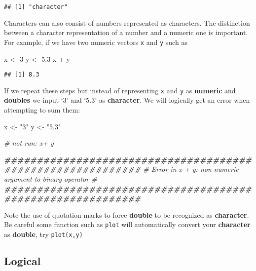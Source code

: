 \documentclass[
]{article}
\newenvironment{Shaded}{\begin{snugshade}}{\end{snugshade}}
\newcommand{\CommentTok}[1]{\textcolor[rgb]{0.56,0.35,0.01}{\textit{#1}}}
\newcommand{\DecValTok}[1]{\textcolor[rgb]{0.00,0.00,0.81}{#1}}
\newcommand{\DocumentationTok}[1]{\textcolor[rgb]{0.56,0.35,0.01}{\textbf{\textit{#1}}}}
\newcommand{\FloatTok}[1]{\textcolor[rgb]{0.00,0.00,0.81}{#1}}
\newcommand{\NormalTok}[1]{#1}
\newcommand{\OtherTok}[1]{\textcolor[rgb]{0.56,0.35,0.01}{#1}}
\newcommand{\SpecialCharTok}[1]{\textcolor[rgb]{0.00,0.00,0.00}{#1}}
\newcommand{\StringTok}[1]{\textcolor[rgb]{0.31,0.60,0.02}{#1}}
\begin{document}
\begin{verbatim}
## [1] "character"
\end{verbatim}

Characters can also consist of numbers represented as characters. The
distinction between a character representation of a number and a numeric
one is important. For example, if we have two numeric vectors \texttt{x}
and \texttt{y} such as

\begin{Shaded}
\begin{Highlighting}[]
\NormalTok{x }\OtherTok{\textless{}{-}} \DecValTok{3}
\NormalTok{y }\OtherTok{\textless{}{-}} \FloatTok{5.3}
\NormalTok{x }\SpecialCharTok{+}\NormalTok{ y}
\end{Highlighting}
\end{Shaded}

\begin{verbatim}
## [1] 8.3
\end{verbatim}

If we repeat these steps but instead of representing \texttt{x} and
\texttt{y} as \textbf{numeric} and \textbf{doubles} we input `3' and
`5.3' as \textbf{character}. We will logically get an error when
attempting to sum them:

\begin{Shaded}
\begin{Highlighting}[]
\NormalTok{x }\OtherTok{\textless{}{-}} \StringTok{"3"}
\NormalTok{y }\OtherTok{\textless{}{-}} \StringTok{"5.3"}

\CommentTok{\# not run:  x+ y}

\DocumentationTok{\#\#\#\#\#\#\#\#\#\#\#\#\#\#\#\#\#\#\#\#\#\#\#\#\#\#\#\#\#\#\#\#\#\#\#\#\#\#\#\#\#\#\#\#\#\#\#\#\#\#\#\#\#\#\#\#\#\#\#}
\CommentTok{\# Error in x + y: non{-}numeric argument to binary operator \#}
\DocumentationTok{\#\#\#\#\#\#\#\#\#\#\#\#\#\#\#\#\#\#\#\#\#\#\#\#\#\#\#\#\#\#\#\#\#\#\#\#\#\#\#\#\#\#\#\#\#\#\#\#\#\#\#\#\#\#\#\#\#\#\#}
\end{Highlighting}
\end{Shaded}

Note the use of quotation marks to force \textbf{double} to be
recognized as \textbf{character}. Be careful some function such as
\texttt{plot} will automatically convert your \textbf{character} as
\textbf{double}, try \texttt{plot(x,y)}

\hypertarget{logical}{%
\subsection{Logical}\label{logical}}
\end{document}
